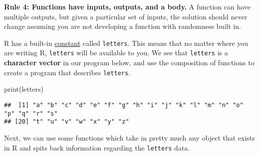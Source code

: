 \documentclass[
]{book}
\newenvironment{Shaded}{\begin{snugshade}}{\end{snugshade}}
\newcommand{\FunctionTok}[1]{\textcolor[rgb]{0.00,0.00,0.00}{#1}}
\newcommand{\NormalTok}[1]{#1}
\begin{document}
\textbf{Rule 4: Functions have inputs, outputs, and a body.} A function can have multiple outputs, but given a particular set of inputs, the solution should never change assuming you are not developing a function with randomness built in.

R has a built-in \href{https://stat.ethz.ch/R-manual/R-devel/library/base/html/Constants.html}{constant} called \texttt{letters}. This means that no matter where you are writing R, \texttt{letters} will be available to you. We see that \texttt{letters} is a \textbf{character} \textbf{vector} in our program below, and use the composition of functions to create a program that describes \texttt{letters}.

\begin{Shaded}
\begin{Highlighting}[]
\FunctionTok{print}\NormalTok{(letters)}
\end{Highlighting}
\end{Shaded}

\begin{verbatim}
##  [1] "a" "b" "c" "d" "e" "f" "g" "h" "i" "j" "k" "l" "m" "n" "o" "p" "q" "r" "s"
## [20] "t" "u" "v" "w" "x" "y" "z"
\end{verbatim}

Next, we can use some functions which take in pretty much any object that exists in R and spits back information regarding the \texttt{letters} data.
\end{document}
